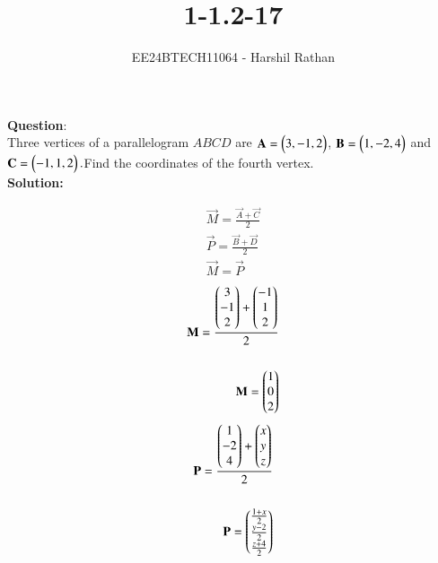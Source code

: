 \documentclass[journal]{IEEEtran}
\begin{document}

\vspace{3cm}

\title{1-1.2-17}
\author{EE24BTECH11064 - Harshil Rathan }
{\let\newpage\relax\maketitle}

\renewcommand{\thefigure}{\theenumi}
\renewcommand{\thetable}{\theenumi}
\setlength{\intextsep}{10pt} %


\renewcommand{\thetable}{\theenumi}
\textbf{Question}:\\
Three vertices of a parallelogram $ABCD$ are $\mathbf{A}=\begin{pmatrix}3,-1,2\end{pmatrix}$, $\mathbf{B}=\begin{pmatrix}1,-2,4\end{pmatrix}$ and $\mathbf{C}=\begin{pmatrix}-1,1,2\end{pmatrix}.$Find the coordinates of the fourth vertex.
\\
\textbf{Solution: }
\begin{table}[h!]    
  \centering
  
\end{table}
\begin{align}
    \vec{M} = \frac{\vec{A}+\vec{C}}{2}\\
    \vec{P} = \frac{\vec{B}+\vec{D}}{2}\\
    \vec{M} = \vec{P}
\end{align}    
\begin{align}    
\mathbf{M}=\frac{\begin{pmatrix}3\\-1\\2\end{pmatrix}+\begin{pmatrix}-1\\1\\2\end{pmatrix}}{2}\\\\
\mathbf{M} =\begin{pmatrix}1\\0\\2\end{pmatrix}\\
\end{align}
\begin{align}
\mathbf{P}=\frac{\begin{pmatrix}1\\-2\\4\end{pmatrix}+\begin{pmatrix}x\\y\\z\end{pmatrix}}{2}\\\\
\mathbf{P}=\begin{pmatrix}\frac{1+x}{2}\\ \frac{y-2}{2} \\ \frac{z+4}{2}\end{pmatrix}\\
\end{align}
\end{document}
